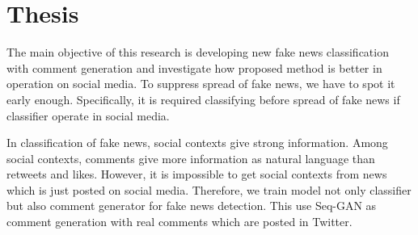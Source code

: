 \section{Thesis}
The main objective of this research is developing new fake news classification 
with comment generation and investigate how proposed method is better in operation on social media.
To suppress spread of fake news, we have to spot it early enough.
Specifically, it is required classifying before spread of fake news if classifier operate in social media.

In classification of fake news, social contexts give strong information.
Among social contexts, comments give more information as natural language than retweets and likes.
However, it is impossible to get social contexts from news which is just posted on social media.
Therefore, we train model not only classifier but also comment generator for fake news detection.
This use Seq-GAN \cite{Yu:2017:SSG:3298483.3298649} as comment generation with real comments which are posted in Twitter.